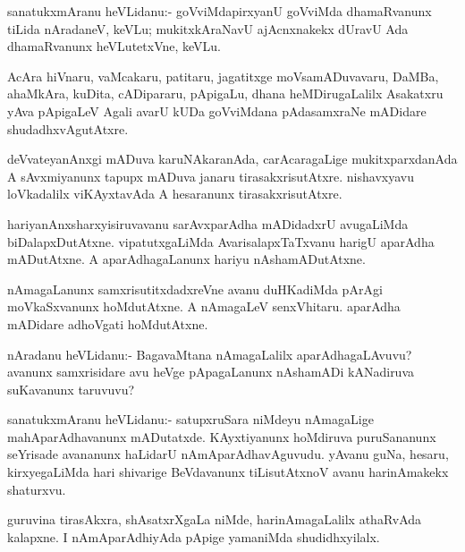 \begin{mng}
sanatukxmAranu heVLidanu:- goVviMdapirxyanU goVviMda dhamaRvanunx tiLida nAradaneV, keVLu; mukitxkAraNavU ajAcnxnakekx dUravU Ada dhamaRvanunx heVLutetxVne, keVLu.
\end{mng}

\begin{mng}
AcAra hiVnaru, vaMcakaru, patitaru, jagatitxge moVsamADuvavaru, DaMBa, ahaMkAra, kuDita, cADipararu, pApigaLu, dhana heMDirugaLalilx Asakatxru yAva pApigaLeV Agali avarU kUDa goVviMdana pAdasamxraNe mADidare shudadhxvAgutAtxre.
\end{mng}

\begin{mng}
deVvateyanAnxgi mADuva karuNAkaranAda, carAcaragaLige mukitxparxdanAda A sAvxmiyanunx tapupx mADuva janaru tirasakxrisutAtxre. nishavxyavu loVkadalilx viKAyxtavAda A hesaranunx tirasakxrisutAtxre.
\end{mng}

\begin{mng}
hariyanAnxsharxyisiruvavanu sarAvxparAdha mADidadxrU avugaLiMda biDalapxDutAtxne. vipatutxgaLiMda AvarisalapxTaTxvanu harigU aparAdha mADutAtxne. A aparAdhagaLanunx hariyu nAshamADutAtxne.
\end{mng}

\begin{mng}
nAmagaLanunx samxrisutitxdadxreVne avanu duHKadiMda pArAgi moVkaSxvanunx hoMdutAtxne. A nAmagaLeV senxVhitaru. aparAdha mADidare adhoVgati hoMdutAtxne.
\end{mng}

\begin{mng}
nAradanu heVLidanu:- BagavaMtana nAmagaLalilx aparAdhagaLAvuvu? avanunx samxrisidare avu heVge pApagaLanunx nAshamADi kANadiruva suKavanunx taruvuvu?
\end{mng}

\begin{mng}
sanatukxmAranu heVLidanu:- satupxruSara niMdeyu nAmagaLige mahAparAdhavanunx mADutatxde. KAyxtiyanunx hoMdiruva puruSananunx seYrisade avananunx haLidarU nAmAparAdhavAguvudu. yAvanu guNa, hesaru, kirxyegaLiMda hari shivarige BeVdavanunx tiLisutAtxnoV avanu harinAmakekx shaturxvu.
\end{mng}

\begin{mng}
guruvina tirasAkxra, shAsatxrXgaLa niMde, harinAmagaLalilx athaRvAda kalapxne. I nAmAparAdhiyAda pApige yamaniMda shudidhxyilalx.
\end{mng}

